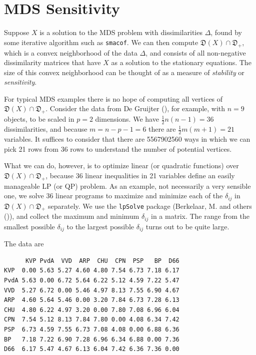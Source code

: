 \documentclass[
  12pt,
  letterpaper,
  DIV=11,
  numbers=noendperiod]{scrreprt}
\theoremstyle{remark}
\begin{document}
\section{MDS Sensitivity}\label{mds-sensitivity}

Suppose \(X\) is a solution to the MDS problem with dissimilarities
\(\Delta\), found by some iterative algorithm such as \texttt{smacof}.
We can then compute \(\mathfrak{D}(X)\cap\mathfrak{D}_+\), which is a
convex neighborhood of the data \(\Delta\), and consists of all
non-negative dissimilarity matrices that have \(X\) as a solution to the
stationary equations. The size of this convex neighborhood can be
thought of as a measure of \emph{stability} or \emph{sensitivity}.

For typical MDS examples there is no hope of computing all vertices of
\(\mathfrak{D}(X)\cap\mathfrak{D}_+\). Consider the data from De
Gruijter (), for example, with \(n=9\)
objects, to be scaled in \(p=2\) dimensions. We have
\(\frac12 n(n-1)=36\) dissimilarities, and because \(m=n-p-1=6\) there
are \(\frac12 m(m+1)=21\) variables. It suffices to consider that there
are 5567902560 ways in which we can pick 21 rows from 36 rows to
understand the number of potential vertices.

What we can do, however, is to optimize linear (or quadratic functions)
over \(\mathfrak{D}(X)\cap\mathfrak{D}_+\), because 36 linear
inequalities in 21 variables define an easily manageable LP (or QP)
problem. As an example, not necessarily a very sensible one, we solve 36
linear programs to maximize and minimize each of the \(\delta_{ij}\) in
\(\mathfrak{D}(X)\cap\mathfrak{D}_+\) separately. We use the
\texttt{lpSolve} package (Berkelaar, M. and others
()), and collect the maximum and
minimum \(\delta_{ij}\) in a matrix. The range from the smallest
possible \(\delta_{ij}\) to the largest possible \(\delta_{ij}\) turns
out to be quite large.

The data are

\begin{verbatim}
      KVP PvdA  VVD  ARP  CHU  CPN  PSP   BP  D66
KVP  0.00 5.63 5.27 4.60 4.80 7.54 6.73 7.18 6.17
PvdA 5.63 0.00 6.72 5.64 6.22 5.12 4.59 7.22 5.47
VVD  5.27 6.72 0.00 5.46 4.97 8.13 7.55 6.90 4.67
ARP  4.60 5.64 5.46 0.00 3.20 7.84 6.73 7.28 6.13
CHU  4.80 6.22 4.97 3.20 0.00 7.80 7.08 6.96 6.04
CPN  7.54 5.12 8.13 7.84 7.80 0.00 4.08 6.34 7.42
PSP  6.73 4.59 7.55 6.73 7.08 4.08 0.00 6.88 6.36
BP   7.18 7.22 6.90 7.28 6.96 6.34 6.88 0.00 7.36
D66  6.17 5.47 4.67 6.13 6.04 7.42 6.36 7.36 0.00
\end{verbatim}
\end{document}
